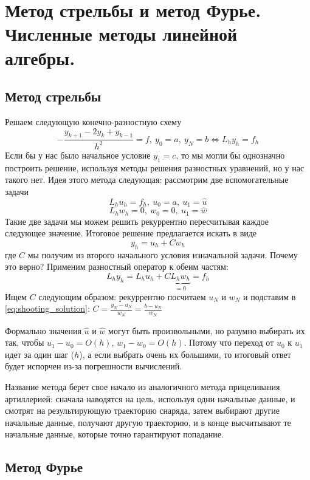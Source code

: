 \section{Метод стрельбы и метод Фурье. Численные методы линейной алгебры.}

\subsection*{Метод стрельбы}

Решаем следующую конечно-разностную схему
\[-\frac{y_{k+1}-2y_k+y_{k-1}}{h^2}=f,\ y_0=a,\ y_N=b\Leftrightarrow L_hy_h=f_h\]
Если бы у нас было начальное условие $y_1=c$, то мы могли бы
однозначно построить решение, используя методы решения разностных
уравнений, но у нас такого нет. Идея этого метода следующая:
рассмотрим две вспомогательные задачи
\[L_hu_h=f_h,\ u_0=a,\ u_1=\hat{u}\]
\[L_hw_h=0,\ w_0=0,\ u_1=\hat{w}\]
Такие две задачи мы можем решить рекуррентно пересчитывая каждое
следующее значение. Итоговое решение предлагается искать в виде
\begin{equation}\label{eq:shooting_solution}
  y_h=u_h+Cw_h
\end{equation}
где $C$ мы получим из второго начального
условия изначальной задачи. Почему это верно? Применим
разностный оператор к обеим частям:
\[L_hy_h = L_hu_h + C\underbrace{L_hw_h}_{=0}=f_h\]
Ищем $C$ следующим образом: рекуррентно посчитаем $u_N$ и $w_N$
и подставим в \eqref{eq:shooting_solution}: $C=\frac{y_N-u_N}{w_N}=\frac{b-u_N}{w_N}$

Формально значения $\hat{u}$ и $\hat{w}$ могут быть произвольными,
но разумно выбирать их так, чтобы $u_1-u_0=O(h)$, $w_1-w_0=O(h)$.
Потому что переход от $u_0$ к $u_1$ идет за один шаг ($h$),
а если выбрать очень их большими, то итоговый ответ будет испорчен
из-за погрешности вычислений.

\begin{remark}
  Название метода берет свое начало из аналогичного метода
  прицеливания артиллерией: сначала наводятся на цель, используя
  одни начальные данные, и смотрят на результирующую траекторию снаряда,
  затем выбирают другие начальные данные, получают другую траекторию,
  и в конце высчитывают те начальные данные, которые точно гарантируют попадание.
\end{remark}

\subsection*{Метод Фурье}

